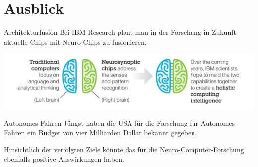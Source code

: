 \section{Ausblick}

\begin{slide}{Architekturfusion}
	Bei IBM Research plant man in der Forschung in Zukunft aktuelle Chips mit Neuro-Chips zu fusionieren.
	
	\includegraphics[width=\textwidth,height=0.8\textheight,keepaspectratio]{content/ibm_fusion.jpg}
\end{slide}

\begin{slide}{Autonomes Fahren}
	Jüngst haben die USA für die Forschung für Autonomes Fahren ein Budget von vier Milliarden Dollar bekannt gegeben.
	
	Hinsichtlich der verfolgten Ziele könnte das für die Neuro-Computer-Forschung ebenfalls positive Auswirkungen haben.
\end{slide}